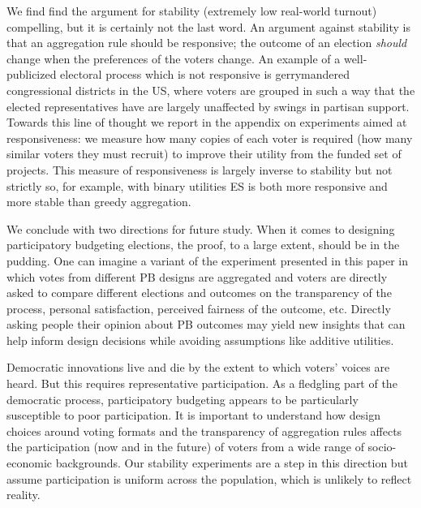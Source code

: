\documentclass[twoside,11pt]{article}
\newcommand{\mes}{ES}
\begin{document}
 We find find the argument for stability (extremely low real-world turnout) compelling, but it is certainly not the last word. An argument against stability is that an aggregation rule should be responsive;  the outcome of an election \emph{should} change when the preferences of the voters change.  An example of a well-publicized electoral process which is not responsive is gerrymandered congressional districts in the US, where voters are grouped in such a way that the elected representatives have are largely unaffected by swings in partisan support. Towards this line of thought we report in the appendix  on experiments aimed at responsiveness: we measure how many copies of each voter is required (how many similar voters they must recruit) to improve their utility from the funded set of projects. 
 This measure of responsiveness is largely inverse to stability but not strictly so, for example, with binary utilities \mes{} is both more responsive and more stable than greedy aggregation. 

We conclude with  two directions for future study.  
When it comes to designing participatory budgeting elections, the proof, to a large extent, should be in the pudding.   
One can imagine a  variant of the experiment presented in this paper in which votes from different PB designs are aggregated and voters are directly asked to compare different elections and outcomes on the transparency of the process, personal satisfaction, perceived fairness of the outcome, etc. 
Directly asking people their opinion about PB outcomes may yield new  insights   that can help inform design decisions while avoiding assumptions like  additive utilities. 

Democratic innovations live and die by the extent to which voters' voices are heard. But this requires representative participation. 
As a fledgling part of the democratic process, participatory budgeting appears to be particularly susceptible to poor participation. It is important to understand how   design choices around voting formats and the transparency of aggregation rules affects the participation (now and in the future) of voters from a wide range of socio-economic backgrounds. Our stability experiments are a step in this direction but assume participation is uniform across the population, which is unlikely to reflect reality. 

\vskip 0.2in


\end{document}

